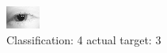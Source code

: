 \begin{figure}[h!]
\begin{center}
\includegraphics[width=0.60\columnwidth]{figures/ID39_class_4_target_3.png}
\end{center}
\caption{ Classification: 4 actual target: 3}
\label{fig:ID39_class_4_target_3}
\end{figure}
